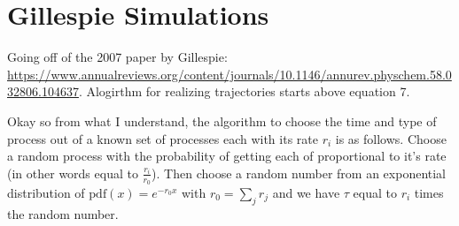 \documentclass[11pt]{article}
\begin{document}
\section{Gillespie Simulations}\label{sec:gillespie}
Going off of the 2007 paper by Gillespie: \url{https://www.annualreviews.org/content/journals/10.1146/annurev.physchem.58.032806.104637}.
Alogirthm for realizing trajectories starts above equation 7.

Okay so from what I understand, the algorithm to choose the time and type of process out of a known set of processes each with its rate $r_i$ is as follows.
Choose a random process with the probability of getting each of proportional to it's rate (in other words equal to $\frac{r_i}{r_0}$).
Then choose a random number from an exponential distribution of $\text{pdf}(x) = e^{-r_0x}$ with $r_0=\sum_j r_j$ and we have $\tau$ equal to $r_i$ times the random number.

\end{document}
